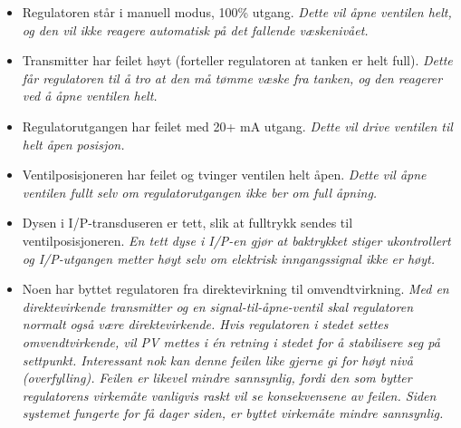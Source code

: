 \begin{itemize}
\item{} Regulatoren står i manuell modus, 100\% utgang. {\it Dette vil åpne ventilen helt, og den vil ikke reagere automatisk på det fallende væskenivået.}
\vskip 10pt
\item{} Transmitter har feilet høyt (forteller regulatoren at tanken er helt full). {\it Dette får regulatoren til å tro at den må tømme væske fra tanken, og den reagerer ved å åpne ventilen helt.}
\vskip 10pt
\item{} Regulatorutgangen har feilet med 20+ mA utgang. {\it Dette vil drive ventilen til helt åpen posisjon.}
\vskip 10pt
\item{} Ventilposisjoneren har feilet og tvinger ventilen helt åpen. {\it Dette vil åpne ventilen fullt selv om regulatorutgangen ikke ber om full åpning.}
\vskip 10pt
\item{} Dysen i I/P-transduseren er tett, slik at fulltrykk sendes til ventilposisjoneren. {\it En tett dyse i I/P-en gjør at baktrykket stiger ukontrollert og I/P-utgangen metter høyt selv om elektrisk inngangssignal ikke er høyt.}
\vskip 10pt
\item{} Noen har byttet regulatoren fra direktevirkning til omvendtvirkning. {\it Med en direktevirkende transmitter og en signal-til-åpne-ventil skal regulatoren normalt også være direktevirkende. Hvis regulatoren i stedet settes omvendtvirkende, vil PV mettes i én retning i stedet for å stabilisere seg på settpunkt. Interessant nok kan denne feilen like gjerne gi for høyt nivå (overfylling). Feilen er likevel mindre sannsynlig, fordi den som bytter regulatorens virkemåte vanligvis raskt vil se konsekvensene av feilen. Siden systemet fungerte for få dager siden, er byttet virkemåte mindre sannsynlig.}
\end{itemize}



